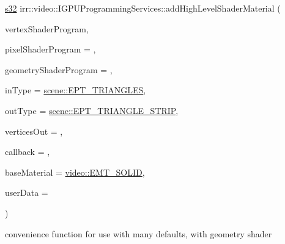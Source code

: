 {\footnotesize\ttfamily \hyperlink{namespaceirr_ac66849b7a6ed16e30ebede579f9b47c6}{s32} irr\+::video\+::\+I\+G\+P\+U\+Programming\+Services\+::add\+High\+Level\+Shader\+Material (\begin{DoxyParamCaption}\item[{const \hyperlink{namespaceirr_a9395eaea339bcb546b319e9c96bf7410}{c8} $\ast$}]{vertex\+Shader\+Program,  }\item[{const \hyperlink{namespaceirr_a9395eaea339bcb546b319e9c96bf7410}{c8} $\ast$}]{pixel\+Shader\+Program = {},  }\item[{const \hyperlink{namespaceirr_a9395eaea339bcb546b319e9c96bf7410}{c8} $\ast$}]{geometry\+Shader\+Program = {},  }\item[{\hyperlink{namespaceirr_1_1scene_a5d7de82f2169761194b2f44d95cdc1dc}{scene\+::\+E\+\_\+\+P\+R\+I\+M\+I\+T\+I\+V\+E\+\_\+\+T\+Y\+PE}}]{in\+Type = {\ttfamily \hyperlink{namespaceirr_1_1scene_a5d7de82f2169761194b2f44d95cdc1dca6c884c4de3210b3ed36c99fb828ce376}{scene\+::\+E\+P\+T\+\_\+\+T\+R\+I\+A\+N\+G\+L\+ES}},  }\item[{\hyperlink{namespaceirr_1_1scene_a5d7de82f2169761194b2f44d95cdc1dc}{scene\+::\+E\+\_\+\+P\+R\+I\+M\+I\+T\+I\+V\+E\+\_\+\+T\+Y\+PE}}]{out\+Type = {\ttfamily \hyperlink{namespaceirr_1_1scene_a5d7de82f2169761194b2f44d95cdc1dcab294abafc2b538342892eac7441faf3a}{scene\+::\+E\+P\+T\+\_\+\+T\+R\+I\+A\+N\+G\+L\+E\+\_\+\+S\+T\+R\+IP}},  }\item[{\hyperlink{namespaceirr_a0416a53257075833e7002efd0a18e804}{u32}}]{vertices\+Out = {},  }\item[{\hyperlink{classirr_1_1video_1_1IShaderConstantSetCallBack}{I\+Shader\+Constant\+Set\+Call\+Back} $\ast$}]{callback = {},  }\item[{\hyperlink{namespaceirr_1_1video_ac8e9b6c66f7cebabd1a6d30cbc5430f1}{E\+\_\+\+M\+A\+T\+E\+R\+I\+A\+L\+\_\+\+T\+Y\+PE}}]{base\+Material = {\ttfamily \hyperlink{namespaceirr_1_1video_ac8e9b6c66f7cebabd1a6d30cbc5430f1aa0b13db05ac3b5f40e692769de202660}{video\+::\+E\+M\+T\+\_\+\+S\+O\+L\+ID}},  }\item[{\hyperlink{namespaceirr_ac66849b7a6ed16e30ebede579f9b47c6}{s32}}]{user\+Data = {} }\end{DoxyParamCaption})\hspace{0.3cm}{\ttfamily [inline]}}



convenience function for use with many defaults, with geometry shader 

